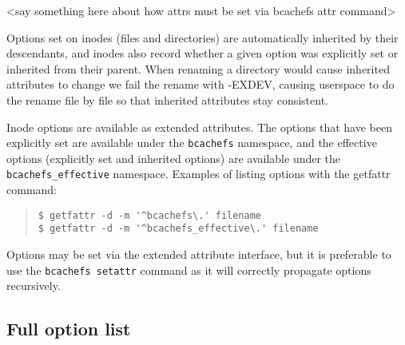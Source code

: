 \documentclass{article}
\begin{document}
<say something here about how attrs must be set via bcachefs attr command>

Options set on inodes (files and directories) are automatically inherited by
their descendants, and inodes also record whether a given option was explicitly
set or inherited from their parent. When renaming a directory would cause
inherited attributes to change we fail the rename with -EXDEV, causing userspace
to do the rename file by file so that inherited attributes stay consistent.

Inode options are available as extended attributes. The options that have been
explicitly set are available under the \texttt{bcachefs} namespace, and the
effective options (explicitly set and inherited options) are available under the
\texttt{bcachefs\_effective} namespace. Examples of listing options with the
getfattr command:

\begin{quote} \begin{verbatim}
$ getfattr -d -m '^bcachefs\.' filename
$ getfattr -d -m '^bcachefs_effective\.' filename
\end{verbatim} \end{quote}

Options may be set via the extended attribute interface, but it is preferable to
use the \texttt{bcachefs setattr} command as it will correctly propagate options
recursively.

\subsection{Full option list}
\end{document}
